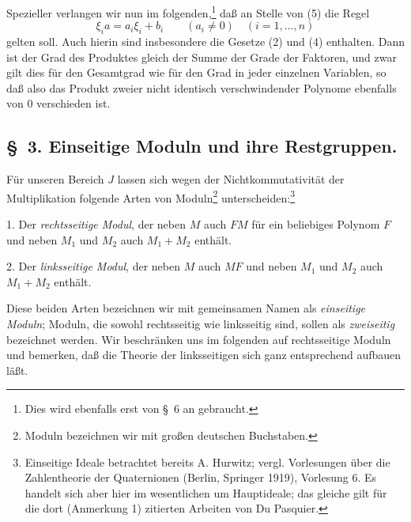 \documentclass[11pt]{article}
\begin{document}
Spezieller verlangen wir nun im folgenden,\footnote{Dies wird ebenfalls erst von \S~6 an gebraucht.} daß an Stelle von (5) die Regel
\begin{equation}
 \xi_i a=a_i\xi_i+b_i\qquad (a_i\ne0)\quad(i=1,\ldots,n)
\tag{6}
\end{equation}
gelten soll. Auch hierin sind insbesondere die Gesetze (2) und (4) enthalten. Dann ist der Grad des Produktes gleich der Summe der Grade der Faktoren, und zwar gilt dies für den Gesamtgrad wie für den Grad in jeder einzelnen Variablen, so daß also das Produkt zweier nicht identisch verschwindender Polynome ebenfalls von 0 verschieden ist.

\subsection*{\S~3. Einseitige Moduln und ihre Restgruppen.}

Für unseren Bereich $J$ lassen sich wegen der Nichtkommutativität der Multiplikation folgende Arten von Moduln\footnote{Moduln bezeichnen wir mit großen deutschen Buchstaben.} unterscheiden:\footnote{Einseitige Ideale betrachtet bereits A. Hurwitz; vergl. Vorlesungen über die Zahlentheorie der Quaternionen (Berlin, Springer 1919), Vorlesung 6. Es handelt sich aber hier im wesentlichen um Hauptideale; das gleiche gilt für die dort (Anmerkung 1) zitierten Arbeiten von Du Pasquier.}

1. Der \emph{rechtsseitige Modul}, der neben $M$ auch $FM$ für ein beliebiges Polynom $F$ und neben $M_1$ und $M_2$ auch $M_1+M_2$ enthält.

2. Der \emph{linksseitige Modul}, der neben $M$ auch $MF$ und neben $M_1$ und $M_2$ auch $M_1+M_2$ enthält.

Diese beiden Arten bezeichnen wir mit gemeinsamen Namen als \emph{einseitige Moduln}; Moduln, die sowohl rechtsseitig wie linksseitig sind, sollen als \emph{zweiseitig} bezeichnet werden. Wir beschränken uns im folgenden auf rechtsseitige Moduln und bemerken, daß die Theorie der linksseitigen sich ganz entsprechend aufbauen läßt.
\end{document}
